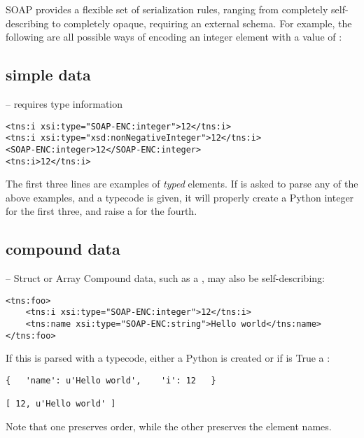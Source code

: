 SOAP provides a flexible set of serialization rules, ranging from
completely self-describing to completely opaque, requiring an external
schema. For example, the following are all possible ways of encoding an
integer element  with a value of :

\subsection{simple data} -- requires type information
\begin{verbatim}
<tns:i xsi:type="SOAP-ENC:integer">12</tns:i>
<tns:i xsi:type="xsd:nonNegativeInteger">12</tns:i>
<SOAP-ENC:integer>12</SOAP-ENC:integer>
<tns:i>12</tns:i>
\end{verbatim}

The first three lines are examples of \emph{typed} elements.
If \ZSI{} is asked to parse any of the above examples, and a
 typecode is given, it will properly create a Python
integer for the first three, and raise a 
for the fourth.

\subsection{compound data} -- Struct or Array
Compound data, such as a , may also be self-describing:
\begin{verbatim}
<tns:foo>
    <tns:i xsi:type="SOAP-ENC:integer">12</tns:i>
    <tns:name xsi:type="SOAP-ENC:string">Hello world</tns:name>
</tns:foo>
\end{verbatim}

If this is parsed with a  typecode, either a Python 
is created or if  is True a :
\begin{verbatim}
{   'name': u'Hello world',    'i': 12   }

[ 12, u'Hello world' ]
\end{verbatim}
Note that one preserves order, while the other preserves the element names.

